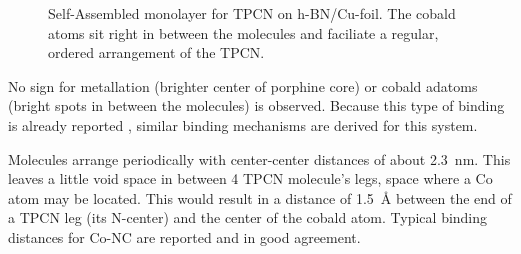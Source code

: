   \begin{figure}[!h]
  	\centering
  	\caption{Self-Assembled monolayer for TPCN on h-BN/Cu-foil. The cobald atoms sit right in between the molecules and faciliate a regular, ordered arrangement of the TPCN.}
  \end{figure}
  
  No sign for metallation (brighter center of porphine core) or cobald adatoms (bright spots in between the molecules) is observed. Because this type of binding is already reported \cite{urgel_controlling_2015}, similar binding mechanisms are derived for this system.
  
  Molecules arrange periodically with center-center distances of about \SI{2.3}{\nano \meter}. This leaves a little void space in between 4 TPCN molecule's legs, space where a Co atom may be located. This would result in a distance of \SI{1.5}{\angstrom} between the end of a TPCN leg (its N-center) and the center of the cobald atom. Typical binding distances for Co-NC are reported \cite{schlickum_metalorganic_2007, przychodzen_supramolecular_2006} and in good agreement.
  
